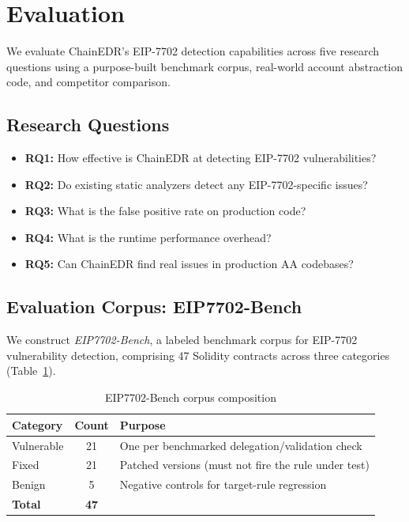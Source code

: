 \section{Evaluation}
\label{sec:evaluation}

We evaluate ChainEDR's EIP-7702 detection capabilities across five research questions using a purpose-built benchmark corpus, real-world account abstraction code, and competitor comparison.

\subsection{Research Questions}

\begin{itemize}
    \item \textbf{RQ1:} How effective is ChainEDR at detecting EIP-7702 vulnerabilities?
    \item \textbf{RQ2:} Do existing static analyzers detect any EIP-7702-specific issues?
    \item \textbf{RQ3:} What is the false positive rate on production code?
    \item \textbf{RQ4:} What is the runtime performance overhead?
    \item \textbf{RQ5:} Can ChainEDR find real issues in production AA codebases?
\end{itemize}

\subsection{Evaluation Corpus: EIP7702-Bench}

We construct \textit{EIP7702-Bench}, a labeled benchmark corpus for EIP-7702 vulnerability detection, comprising 47 Solidity contracts across three categories (Table~\ref{tab:corpus}).

\begin{table}[h]
\centering
\caption{EIP7702-Bench corpus composition}
\label{tab:corpus}
\begin{tabular}{lcl}
\hline
\textbf{Category} & \textbf{Count} & \textbf{Purpose} \\
\hline
Vulnerable & 21 & One per benchmarked delegation/validation check \\
Fixed & 21 & Patched versions (must not fire the rule under test) \\
Benign & 5 & Negative controls for target-rule regression \\
\hline
\textbf{Total} & \textbf{47} & \\
\hline
\end{tabular}
\end{table}

